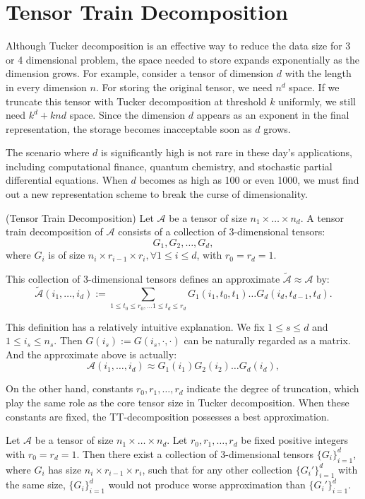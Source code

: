 \documentclass[12pt]{article}
\begin{document}
\section{Tensor Train Decomposition}
Although Tucker decomposition is an effective way to reduce the data size for 3 or 4 dimensional problem, the space needed to store expands exponentially as the dimension grows. For example, consider a tensor of dimension $d$ with the length in every dimension $n$. For storing the original tensor, we need $n^d$ space. If we truncate this tensor with Tucker decomposition at threshold $k$ uniformly, we still need $k^d + knd$ space. Since the dimension $d$ appears as an exponent in the final representation, the storage becomes inacceptable soon as $d$ grows.

The scenario where $d$ is significantly high is not rare in these day's applications, including computational finance, quantum chemistry, and stochastic partial differential equations. When $d$ becomes as high as 100 or even 1000, we must find out a new representation scheme to break the curse of dimensionality.


\begin{mydef}{(Tensor Train Decomposition)}
Let $\mathcal{A}$ be a tensor of size $n_1 \times \dots \times n_d$. A tensor train decomposition of $\mathcal{A}$ consists of a collection of 3-dimensional tensors:
$$ G_1, G_2, \dots, G_d,$$
where $G_i$ is of size $n_i \times r_{i-1} \times r_i, \forall 1 \leq i \leq d$, with $r_0 = r_d = 1$.

This collection of 3-dimensional tensors defines an approximate $\tilde{\mathcal{A}} \approx \mathcal{A}$ by:
$$ \tilde{\mathcal{A}} (i_1, \dots, i_d) :=  \sum_{1 \leq t_0 \leq r_0, \dots 1 \leq t_d \leq r_d} G_1(i_1, t_0, t_1) \dots G_d(i_d, t_{d-1}, t_d).$$
\end{mydef}


This definition has a relatively intuitive explanation. We fix $1 \leq s \leq d$ and $1 \leq i_s \leq n_s$. Then $G(i_s) := G(i_s, \cdot, \cdot)$ can be naturally regarded as a matrix.
And the approximate above is actually:
$$ \mathcal{A}(i_1, \dots, i_d) \approx G_1(i_1)G_2(i_2) \dots G_d(i_d),$$

On the other hand, constants $r_0, r_1, \dots, r_d$ indicate the degree of truncation, which play the same role as the core tensor size in Tucker decomposition. When these constants are fixed, the TT-decomposition possesses a best approximation.

\begin{myprop}
Let $\mathcal{A}$ be a tensor of size $n_1 \times \dots \times n_d$. Let $r_0, r_1, \dots, r_d$ be fixed positive integers with $r_0 = r_d = 1$. Then there exist a collection of 3-dimensional tensors $\{G_i\}_{i = 1}^d$, where $G_i$ has size $n_i \times r_{i-1} \times r_i$, such that for any other collection $\{G_i'\}_{i=1}^d$ with the same size, $\{G_i\}_{i=1}^d$ would not produce worse approximation than $\{G_i'\}_{i=1}^d$.
\end{myprop}
\end{document}
